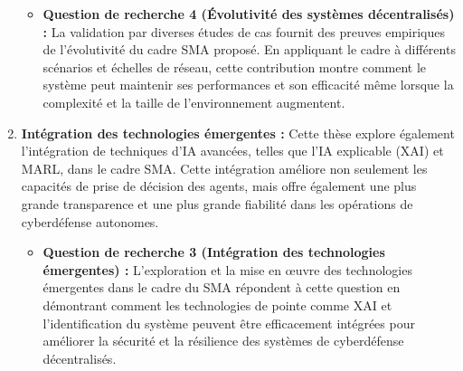 \begin{enumerate}
          \begin{itemize}
              \item \textbf{Question de recherche 4 (Évolutivité des systèmes décentralisés) :} La validation par diverses études de cas fournit des preuves empiriques de l'évolutivité du cadre SMA proposé. En appliquant le cadre à différents scénarios et échelles de réseau, cette contribution montre comment le système peut maintenir ses performances et son efficacité même lorsque la complexité et la taille de l'environnement augmentent.
          \end{itemize}

    \item \textbf{Intégration des technologies émergentes :} Cette thèse explore également l'intégration de techniques d'IA avancées, telles que l'IA explicable (XAI) et MARL, dans le cadre SMA. Cette intégration améliore non seulement les capacités de prise de décision des agents, mais offre également une plus grande transparence et une plus grande fiabilité dans les opérations de cyberdéfense autonomes.

          \begin{itemize}
              \item \textbf{Question de recherche 3 (Intégration des technologies émergentes) :} L'exploration et la mise en œuvre des technologies émergentes dans le cadre du SMA répondent à cette question en démontrant comment les technologies de pointe comme XAI et l'identification du système peuvent être efficacement intégrées pour améliorer la sécurité et la résilience des systèmes de cyberdéfense décentralisés.
          \end{itemize}

\end{enumerate}





